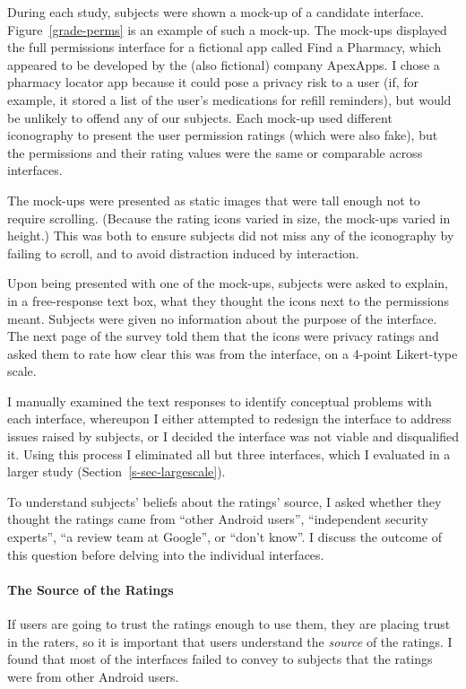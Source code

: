 \documentclass[11pt]{article}
\newcommand{\reffig}[1]{Figure~\ref{#1}}
\newcommand{\refsec}[1]{Section~\ref{#1}}
\begin{document}
During each study, subjects were shown a mock-up of
a candidate interface. \reffig{grade-perms}
is an example of such a mock-up. The mock-ups displayed the full permissions
interface for a fictional app called Find a Pharmacy, which appeared 
to be developed by the (also fictional) company ApexApps. 
I chose a pharmacy locator app because it 
could pose a privacy risk to a user (if, for example, it stored a list
of the user's medications for refill reminders), but 
would be unlikely to offend any of
our subjects. Each mock-up used different iconography to
present the user permission ratings (which were also fake), but the permissions
and their rating values were the same or comparable across interfaces. 

The mock-ups were presented as static images that were tall enough
not to require scrolling. (Because the rating icons
varied in size, the mock-ups varied in height.) This was both
to ensure subjects did not miss any of the iconography by failing to
scroll, and to avoid distraction induced by interaction.

Upon being presented with one of the mock-ups, subjects were
asked to explain, in a free-response text box, 
what they thought the icons next to the permissions 
meant. Subjects were given no information about the 
purpose of the interface. The next page of the survey 
told them that the icons were privacy 
ratings and asked them to rate how clear this was from 
the interface, on a 4-point Likert-type scale. 

I manually examined 
the text responses to identify conceptual problems with each 
interface, whereupon I either attempted 
to redesign the interface to address issues raised by subjects, 
or I decided the interface was not viable and disqualified it.
Using this process I eliminated all but three interfaces, which I evaluated
in a larger study (\refsec{s-sec-largescale}).

To understand subjects' beliefs about the ratings' source, I asked
whether they thought the ratings came from 
 ``other Android users'', ``independent 
security experts'', ``a review team at Google'', or
``don't know''. I discuss the outcome of this question
before delving into the individual interfaces.


\paragraph{The Source of the Ratings}
\label{subsec-small-source}

If users are going to trust the ratings enough to use them, 
they are placing trust in the raters, so it is
important that users understand the \emph{source}
of the ratings. 
I found that most of the interfaces failed to
convey to subjects that the ratings were from other Android users.
\end{document}
